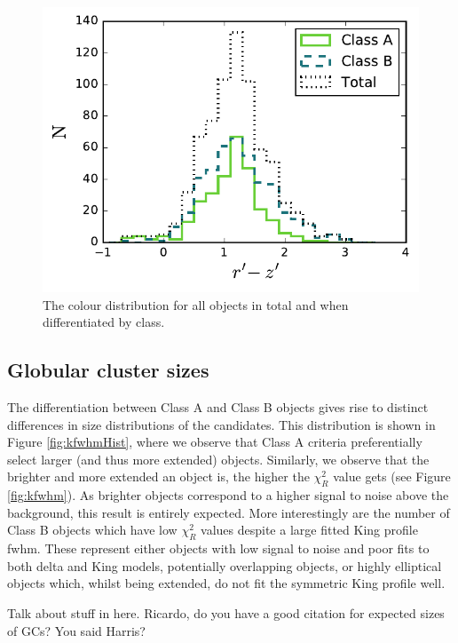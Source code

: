 \documentclass[useAMS,usenatbib]{mn2e}
\begin{document}
 
 
 \begin{figure}
 	\includegraphics[width=\columnwidth]{images/colourHist.pdf}
 	\caption{The colour distribution for all objects in total and when differentiated by class.}
 	\label{fig:colourHist}
 \end{figure}
 
\subsection{Globular cluster sizes}
\label{sec:gc_sizes}

The differentiation between Class A and Class B objects gives rise to distinct differences in size distributions of the candidates. This distribution is shown in Figure \ref{fig:kfwhmHist}, where we observe that Class A criteria preferentially select larger (and thus more extended) objects. Similarly, we observe that the brighter and more extended an object is, the higher the $\chi^2_R$ value gets (see Figure \ref{fig:kfwhm}). As brighter objects correspond to a higher signal to noise above the background, this result is entirely expected. More interestingly are the number of Class B objects which have low $\chi^2_R$ values despite a large fitted King profile fwhm. These represent either objects with low signal to noise and poor fits to both delta and King models, potentially overlapping objects, or highly elliptical objects which, whilst being extended, do not fit the symmetric King profile well.

{\color{red} Talk about stuff in here. Ricardo, do you have a good citation for expected sizes of GCs? You said Harris?}
\end{document}
